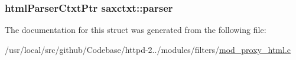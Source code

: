 \subsubsection[{\texorpdfstring{parser}{parser}}]{\setlength{\rightskip}{0pt plus 5cm}html\+Parser\+Ctxt\+Ptr saxctxt\+::parser}\hypertarget{structsaxctxt_a1414b1835a9ed6beb32635536f9f513a}{}\label{structsaxctxt_a1414b1835a9ed6beb32635536f9f513a}


The documentation for this struct was generated from the following file\+:\begin{DoxyCompactItemize}
\item 
/usr/local/src/github/\+Codebase/httpd-\/2../modules/filters/\hyperlink{mod__proxy__html_8c}{mod\+\_\+proxy\+\_\+html.\+c}\end{DoxyCompactItemize}
